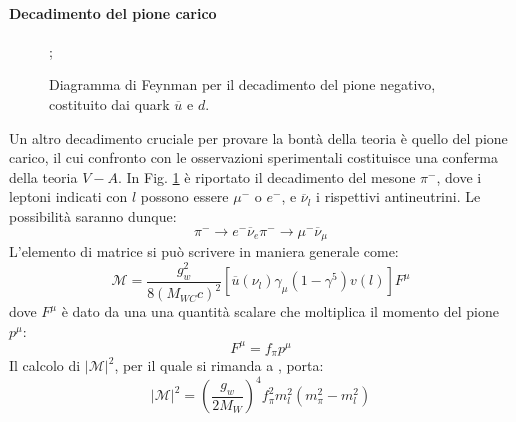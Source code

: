 \documentclass{subnucbo}
\begin{document}
\paragraph{Decadimento del pione carico}
\begin{figure}[!h]
        \centering
        ;
        \caption{Diagramma di Feynman per il decadimento del pione negativo, costituito dai quark $\overline{u}$ e $d$.}
        \label{fig:pion_decay}
\end{figure}
Un altro decadimento cruciale per provare la bontà della teoria è quello del pione carico, il cui confronto con le osservazioni sperimentali costituisce una conferma della teoria $V-A$. In Fig. \ref{fig:pion_decay} è riportato il decadimento del mesone $\pi^{-}$, dove i leptoni indicati con $l$ possono essere $\mu^{-}$ o $e^{-}$, e $\overline{\nu}_{l}$ i rispettivi antineutrini. Le possibilità saranno dunque:
\begin{subequations}
        \begin{equation}
                \pi^{-} \rightarrow e^{-} \overline{\nu}_{e}
                \label{eq:pi_e}
        \end{equation}
        \begin{equation}
                \pi^{-} \rightarrow \mu^{-} \overline{\nu}_{\mu}
                \label{eq:pi_mu}
        \end{equation}
\end{subequations}
L'elemento di matrice si può scrivere in maniera generale come:
\begin{equation}
        \mathcal { M } = \frac { g _ { w } ^ { 2 } } { 8 \left( M _ { W C } c \right) ^ { 2 } } \left[ \overline { u } ( \nu_{l} ) \gamma _ { \mu } \left( 1 - \gamma ^ { 5 } \right) v ( l ) \right] F ^ { \mu }
        \label{eq:matrix_element_pion_decay}
\end{equation}
dove $F^{\mu}$ è dato da una una quantità scalare che moltiplica il momento del pione $p^{\mu}$:
\begin{equation}
        F ^ { \mu } = f _ { \pi } p ^ { \mu }
\end{equation}
Il calcolo di $|\mathcal{M}|^{2}$, per il quale si rimanda a \cite{ref:griff}, porta:
\begin{equation}
         | \mathcal { M } | ^ { 2 }  = \left( \frac { g _ { w } } { 2 M _ { W } } \right) ^ { 4 } f _ { \pi } ^ { 2 } m _ { l } ^ { 2 } \left( m _ { \pi } ^ { 2 } - m _ { l } ^ { 2 } \right)
\end{equation}
\end{document}
